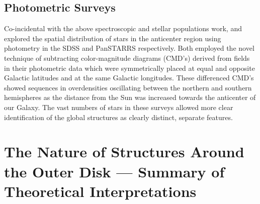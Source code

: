 \documentclass[galaxies,article,submit,moreauthors,pdftex,10pt,a4paper]{mdpi}
\begin{document}

\subsection{Photometric Surveys}

Co-incidental with the above spectroscopic and stellar populations work, \cite{xu15} and \cite{jurie17} explored the spatial distribution of stars in the anticenter region using photometry in the SDSS and PanSTARRS \citep{kaiser10} respectively.
Both employed the novel technique of subtracting color-magnitude diagrams (CMD's) derived from fields in their photometric data which were symmetrically placed at equal and opposite Galactic latitudes and at the same Galactic longitudes.
These differenced CMD's showed sequences in overdensities oscillating between the northern and southern hemispheres as the distance from the Sun was increased towards the anticenter of our Galaxy.
The vast numbers of stars in these surveys allowed more clear identification of the global structures as clearly distinct, separate features.




\section{The Nature of Structures Around the Outer Disk --- Summary of Theoretical Interpretations}
\label{sec:theory}
\end{document}
